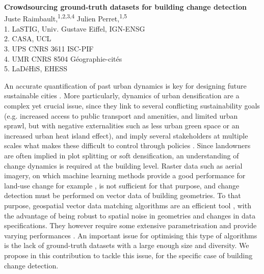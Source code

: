 \documentclass[11pt]{article}
\renewcommand{\title}[1]{{\noindent\large\bfseries#1\medskip\\}}
\renewcommand{\author}[2]{{\noindent #1 \medskip\\ \small #2 \medskip\\}}
\begin{document}
\title{Crowdsourcing ground-truth datasets for building change detection}
\author{
Juste Raimbault,\textsuperscript{1,2,3,4}
Julien Perret,\textsuperscript{1,5}
}
{
1. LaSTIG, Univ. Gustave Eiffel, IGN-ENSG\\
2. CASA, UCL\\
3. UPS CNRS 3611 ISC-PIF\\
4. UMR CNRS 8504 G{\'e}ographie-cit{\'e}s\\
5. LaDéHiS, EHESS
}







An accurate quantification of past urban dynamics is key for designing future sustainable cities \cite{batty2018inventing}. More particularly, dynamics of urban densification are a complex yet crucial issue, since they link to several conflicting sustainability goals \cite{evers2024urbanization} (e.g. increased access to public transport and amenities, and limited urban sprawl, but with negative externalities such as less urban green space or an increased urban heat island effect), and imply several stakeholders at multiple scales what makes these difficult to control through policies \cite{jehling2020densification}. Since landowners are often implied in plot splitting or soft densification, an understanding of change dynamics is required at the building level. Raster data such as aerial imagery, on which machine learning methods provide a good performance for land-use change for example \cite{khelifi2020deep}, is not sufficient for that purpose, and change detection must be performed on vector data of building geometries. To that purpose, geospatial vector data matching algorithms are an efficient tool \cite{xavier2016survey}, with the advantage of being robust to spatial noise in geometries and changes in data specifications. They however require some extensive parametrisation and provide varying performances \cite{guardiola2024optimising}. An important issue for optimising this type of algorithms is the lack of ground-truth datasets with a large enough size and diversity. We propose in this contribution to tackle this issue, for the specific case of building change detection.
\end{document}
